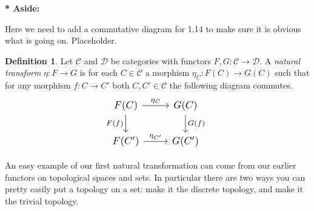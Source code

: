 \documentclass[11pt,a4paper]{article}
\newcommand{\Cat}{\mathcal{C}}
\newcommand{\CatD}{\mathcal{D}}
\newenvironment{asidebar}{%
    \def\FrameCommand{\vrule width 1.5pt \hspace{8pt}}%
    \MakeFramed{\advance\hsize-\width\FrameRestore}%
}{\endMakeFramed}
\newenvironment{aside}{%
    \begin{asidebar}\noindent\textbf{* Aside:}\enspace
}{\end{asidebar}}
\theoremstyle{plain}
\theoremstyle{definition}
\newtheorem{definition}[theorem]{Definition}
\theoremstyle{remark}
\begin{document}
\begin{aside}
    Here we need to add a commutative diagram for 1.14 to make sure it is obvious what is going on. Placeholder.
\end{aside}

\begin{definition}
    Let $\Cat$ and $\CatD$ be categories with functors $F, G: \Cat \to \CatD$. A \emph{natural transform} $\eta : F \to G$ is for each $C \in \Cat$ a morphism $\eta_C: F(C) \to G(C)$ such that for any morphism $f: C \to C'$ both $C, C' \in \Cat$ the following diagram commutes. 
    \[
    \scalebox{1.2}{\begin{tikzcd}[ampersand replacement = \&]
        F(C) \arrow[r, "\eta_C"] \arrow[d, "F(f)"'] \&
        G(C) \arrow[d, "G(f)"] \\
        F(C') \arrow[r, "\eta_{C'}"] \&
        G(C')
    \end{tikzcd}
    }
    \] 
\end{definition}

\noindent
An easy example of our first natural transformation can come from our earlier functors on topological spaces and sets. In particular there are two ways you can pretty easily put a topology on a set: make it the discrete topology, and make it the trivial topology.
\end{document}
